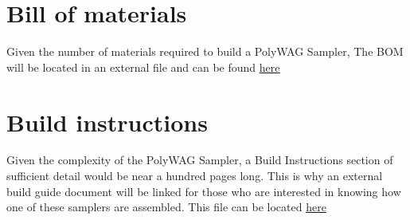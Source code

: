 \documentclass[11pt, letterpaper]{article}
\begin{document}
\section{Bill of materials}



Given the number of materials required to build a PolyWAG Sampler, The BOM will be located in an external file and can be found \href{https://docs.google.com/spreadsheets/d/1WZbGYL1k3ne1a8Z1YOA0necr3MgxMj_BiEK7JuaGnzE/edit#gid=1118434588}{\underline{here}}


\section{Build instructions}

Given the complexity of the PolyWAG Sampler, a Build Instructions section of sufficient detail would be near a hundred pages long. This is why an external build guide document will be linked for those who are interested in knowing how one of these samplers are assembled. This file can be located \href{https://drive.google.com/file/d/1QSpYj-N6-jE-VbXLVelzRzzdIF1lMkuC/view?usp=sharing}{\underline{here}}
\end{document}
